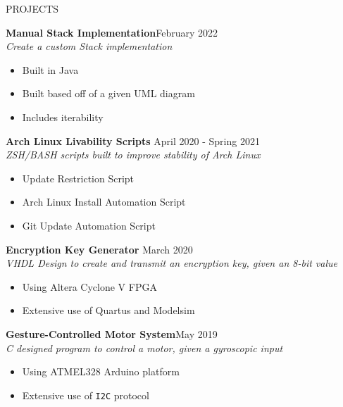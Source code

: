 \documentclass[UTF-8]{resume} \usepackage{multirow}
\begin{document}
\begin{rSection}{PROJECTS}
	\vspace{-1.25em}
\item \textbf{Manual Stack Implementation}\hfill {February 2022} \\
	\emph{Create a custom Stack implementation}
	\begin{itemize}
         \itemsep -5pt {}
          \item Built in Java
	      \item Built based off of a given UML diagram
	      \item Includes iterability
	\end{itemize}
\item \textbf{Arch Linux Livability Scripts} \hfill {April 2020 - Spring 2021}\\
	\emph{ZSH/BASH scripts built to improve stability of Arch Linux}
	\begin{itemize}
	    \itemsep -5pt {}
	         \item Update Restriction Script
	         \item Arch Linux Install Automation Script
		 \item Git Update Automation Script
	\end{itemize}
\item \textbf{Encryption Key Generator} \hfill{March 2020}\\
	\emph{VHDL Design to create and transmit an encryption key, given an 8-bit value}
       \begin{itemize}
           \itemsep -5pt {}
	        \item Using Altera Cyclone V FPGA
		\item Extensive use of Quartus and Modelsim
	\end{itemize}
\item \textbf{Gesture-Controlled Motor System}\hfill {May 2019}\\
	\emph{C designed program to control a motor, given a gyroscopic input}
	\begin{itemize}
          \itemsep -5pt {}
	       \item Using ATMEL328 Arduino platform
	       \item Extensive use of \verb|I2C| protocol
	\end{itemize}
\end{rSection}
\end{document}
